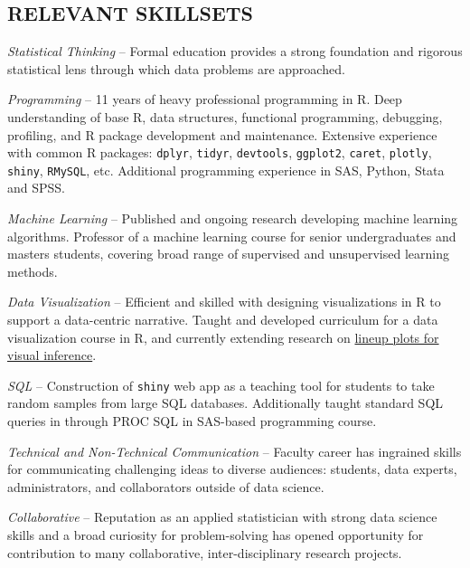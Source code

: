 \documentclass[margin, 10pt]{res}\usepackage[]{graphicx}\usepackage[]{color}
\begin{document}
\begin{resume}
\section{RELEVANT SKILLSETS} 

{\it Statistical Thinking} -- Formal education provides a strong foundation and rigorous statistical lens through which data problems are approached.

{\it Programming} -- 11 years of heavy professional programming in R. Deep understanding of base R, data structures, functional programming, debugging, profiling, and R package development and maintenance. Extensive experience with common R packages: \texttt{dplyr}, \texttt{tidyr}, \texttt{devtools}, \texttt{ggplot2}, \texttt{caret}, \texttt{plotly}, \texttt{shiny}, \texttt{RMySQL}, etc. Additional programming experience in SAS, Python, Stata and SPSS.

{\it Machine Learning} -- Published and ongoing research developing machine learning algorithms. Professor of a machine learning course for senior undergraduates and masters students, covering broad range of supervised and unsupervised learning methods. 

{\it Data Visualization} -- Efficient and skilled with designing visualizations in R to support a data-centric narrative. Taught and developed curriculum for a data visualization course in R, and currently extending research on \href{http://kmaurer.github.io/documents/conferences/JSM2019.pdf}{lineup plots for visual inference}. 

{\it SQL} -- Construction of \texttt{shiny} web app as a teaching tool for students to take random samples from large SQL databases. Additionally taught standard SQL queries in through PROC SQL in SAS-based programming course.
  
 
{\it Technical and Non-Technical Communication} -- Faculty career has ingrained skills for communicating challenging ideas to diverse audiences: students, data experts, administrators, and collaborators outside of data science. 

{\it Collaborative} -- Reputation as an applied statistician with strong data science skills and a broad curiosity for problem-solving has opened opportunity for contribution to many collaborative, inter-disciplinary research projects. 




\end{resume}
\end{document}
